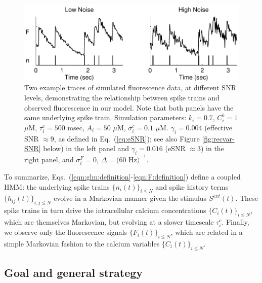 \documentclass[aoas,preprint]{imsart}
\begin{document}
\begin{figure}
\centering \includegraphics[width=\hsize]{../figs/sim_examples}
\caption{Two example traces of simulated fluorescence data, at
  different SNR levels, demonstrating the relationship between spike
  trains and observed fluorescence in our model.  Note that both
  panels have the same underlying spike train. Simulation parameters:
  $k_i=0.7$, $C_i^b=1$ $\mu$M, $\tau^c_i=500$ msec, $A_i=50$ $\mu$M,
  $\sigma^c_i=0.1$ $\mu$M. $\gamma_i=0.004$ (effective SNR $\approx
  9$, as defined in Eq.~(\ref{eq:eSNR}); see also Figure
  \ref{fig:recvar-SNR} below) in the left panel and $\gamma_i=0.016$
  (eSNR $\approx 3$) in the right panel, and $\sigma^F_i=0$,
  $\Delta=(60$ Hz$)^{-1}$.}
\label{fig:example_traces}
\end{figure}

To summarize, Eqs.~(\ref{eqn:glm:definition}-\ref{eqn:F:definition})
define a coupled HMM: the underlying spike trains $\{n_i(t)\}_{i\leq
N}$ and spike history terms $\{h_{ij}(t)\}_{i,j\leq N}$ evolve in a
Markovian manner given the stimulus $S^{ext}(t)$. These spike trains
in turn drive the intracellular calcium concentrations
$\{C_i(t)\}_{i\leq N}$, which are themselves Markovian, but evolving
at a slower timescale $\tau_i^c$. Finally, we observe only the
fluorescence signals $\{F_i(t)\}_{i\leq N}$, which are related in a
simple Markovian fashion to the calcium variables $\{C_i(t)\}_{i\leq
N}$.


\subsection{Goal and general strategy}  \label{sec:methods:goal}
\end{document}

